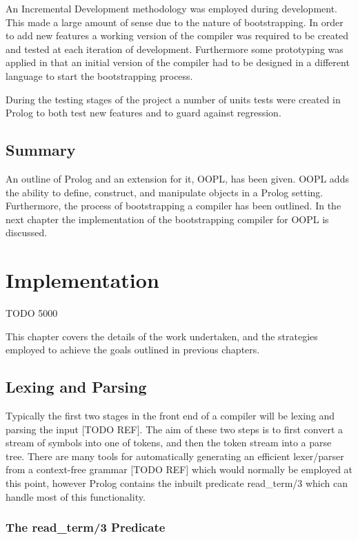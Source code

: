 \documentclass[12pt,a4paper,twoside,openright]{report}
\begin{document}
An Incremental Development methodology was employed during development. This made a large amount of sense due to the nature of bootstrapping. In order to add new features a working version of the compiler was required to be created and tested at each iteration of development. Furthermore some prototyping was applied in that an initial version of the compiler had to be designed in a different language to start the bootstrapping process.

\bigskip

During the testing stages of the project a number of units tests were created in Prolog to both test new features and to guard against regression. 

\section {Summary}

An outline of Prolog and an extension for it, OOPL, has been given. OOPL adds the ability to define, construct, and manipulate objects in a Prolog setting. Furthermore, the process of bootstrapping a compiler has been outlined. In the next chapter the implementation of the bootstrapping compiler for OOPL is discussed.

\chapter{Implementation}

TODO 5000

This chapter covers the details of the work undertaken, and the strategies employed to achieve the goals outlined in previous chapters.

\section{Lexing and Parsing}

Typically the first two stages in the front end of a compiler will be lexing and parsing the input [TODO REF]. The aim of these two steps is to first convert a stream of symbols into one of tokens, and then the token stream into a parse tree. There are many tools for automatically generating an efficient lexer/parser from a context-free grammar [TODO REF] which would normally be employed at this point, however Prolog contains the inbuilt predicate read_term/3 which can handle most of this functionality.

\subsection{The read_term/3 Predicate}
\end{document}
